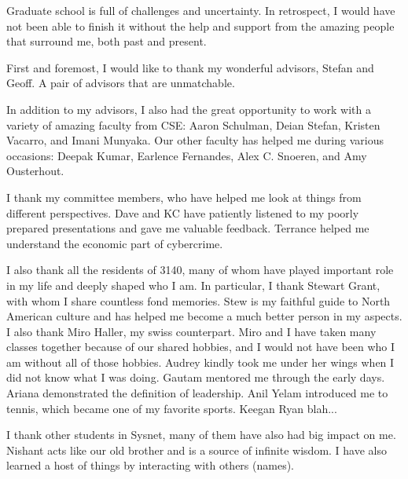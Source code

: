 \documentclass[12pt]{ucsddissertation}
\begin{document}
\begin{acknowledgements}
Graduate school is full of challenges and uncertainty. In retrospect, I would have not been able to finish it without the help and support from the amazing people that surround me, both past and present.

First and foremost, I would like to thank my wonderful advisors, Stefan and Geoff. A pair of advisors that are unmatchable. 

In addition to my advisors, I also had the great opportunity to work with a variety of amazing faculty from CSE: Aaron Schulman, Deian Stefan, Kristen Vacarro, and Imani Munyaka. Our other faculty has helped me during various occasions: Deepak Kumar, Earlence Fernandes, Alex C. Snoeren, and Amy Ousterhout.


I thank my committee members, who have helped me look at things from different perspectives.  Dave and KC have patiently listened to my poorly prepared presentations and gave me valuable feedback. Terrance helped me understand the economic part of cybercrime.

I also thank all the residents of 3140, many of whom have played important role in my life and deeply shaped who I am. In particular, I thank Stewart Grant, with whom I share countless fond memories. Stew is my faithful guide to North American culture and has helped me become a much better person in my aspects. I also thank Miro Haller, my swiss counterpart. Miro and I have
 taken many classes together because of our shared hobbies, and I would not have been who I am without all of those hobbies. Audrey kindly took me under her wings when I did not know what I was doing. Gautam mentored me through the early days. Ariana demonstrated the definition of leadership. Anil Yelam introduced me to tennis, which became one of my favorite sports. Keegan Ryan blah...

I thank other students in Sysnet, many of them have also had big impact on me. Nishant acts like our old brother and is a source of infinite wisdom. I have also learned a host of things by interacting with others (names).


\end{acknowledgements}
\end{document}
